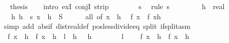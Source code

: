 \begin{isabellebody}
\ \isamarkupfalse%
\ {\isacharquery}{\kern0pt}thesis\isanewline
\ \ \isamarkupfalse%
\ {\isacharparenleft}{\kern0pt}intro\ exI\ conjI\ strip{\isacharparenright}{\kern0pt}\isanewline
\ \ \ \ \isamarkupfalse%
\ {\isachardoublequoteopen}{}\ {\isacharless}{\kern0pt}\ s{\isachardoublequoteclose}\ \isamarkupfalse%
\ {\isacharparenleft}{\kern0pt}rule\ s{\isacharparenright}{\kern0pt}\isanewline
\ \ \isamarkupfalse%
\isanewline
\ \ \ \ \isamarkupfalse%
\ h\ {\isacharcolon}{\kern0pt}{\isacharcolon}{\kern0pt}\ real\isanewline
\ \ \ \ \isamarkupfalse%
\ {\isachardoublequoteopen}{}\ {\isacharless}{\kern0pt}\ h{\isachardoublequoteclose}\ {\isachardoublequoteopen}h\ {\isacharless}{\kern0pt}\ s{\isachardoublequoteclose}\ {\isachardoublequoteopen}x\ {\isacharplus}{\kern0pt}\ h\ {\isasymin}\ S{\isachardoublequoteclose}\isanewline
\ \ \ \ \isamarkupfalse%
\ all\ {\isacharbrackleft}{\kern0pt}of\ {\isachardoublequoteopen}x\ {\isacharplus}{\kern0pt}\ h{\isachardoublequoteclose}{\isacharbrackright}{\kern0pt}\ \isamarkupfalse%
\ {\isachardoublequoteopen}f\ x\ {\isacharless}{\kern0pt}\ f\ {\isacharparenleft}{\kern0pt}x{\isacharplus}{\kern0pt}h{\isacharparenright}{\kern0pt}{\isachardoublequoteclose}\isanewline
\ \ \ \ \isamarkupfalse%
\ {\isacharparenleft}{\kern0pt}simp\ add{\isacharcolon}{\kern0pt}\ abs{\isacharunderscore}{\kern0pt}if\ dist{\isacharunderscore}{\kern0pt}real{\isacharunderscore}{\kern0pt}def\ pos{\isacharunderscore}{\kern0pt}less{\isacharunderscore}{\kern0pt}divide{\isacharunderscore}{\kern0pt}eq\ split{\isacharcolon}{\kern0pt}\ if{\isacharunderscore}{\kern0pt}split{\isacharunderscore}{\kern0pt}asm{\isacharparenright}{\kern0pt}\isanewline
\ \ \ \ \ \ \isamarkupfalse%
\ {\isachardoublequoteopen}{\isasymnot}\ {\isacharparenleft}{\kern0pt}f\ {\isacharparenleft}{\kern0pt}x\ {\isacharplus}{\kern0pt}\ h{\isacharparenright}{\kern0pt}\ {\isacharminus}{\kern0pt}\ f\ x{\isacharparenright}{\kern0pt}\ {\isacharslash}{\kern0pt}\ h\ {\isacharless}{\kern0pt}\ l{\isachardoublequoteclose}\ \ h{\isacharcolon}{\kern0pt}\ {\isachardoublequoteopen}{}\ {\isacharless}{\kern0pt}\ h{\isachardoublequoteclose}\isanewline
\ \ \ \ \ \ \isamarkupfalse%
\ l\ \isamarkupfalse%
\ {\isachardoublequoteopen}{}\ {\isacharless}{\kern0pt}\ {\isacharparenleft}{\kern0pt}f\ {\isacharparenleft}{\kern0pt}x\ {\isacharplus}{\kern0pt}\ h{\isacharparenright}{\kern0pt}\ {\isacharminus}{\kern0pt}\ f\ x{\isacharparenright}{\kern0pt}\ {\isacharslash}{\kern0pt}\ h{\isachardoublequoteclose}\isanewline

\end{isabellebody}
